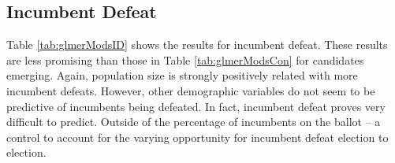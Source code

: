 
\subsection{Incumbent Defeat}

Table \ref{tab:glmerModsID} shows the results for incumbent defeat. These results 
are less promising than those in Table \ref{tab:glmerModsCon} for candidates emerging. 
Again, population size is strongly positively related with more incumbent defeats. 
However, other demographic variables do not seem to be predictive of incumbents 
being defeated. In fact, incumbent defeat proves very difficult to predict. Outside of the 
percentage of incumbents on the ballot -- a control to account for the varying 
opportunity for incumbent defeat election to election. 





